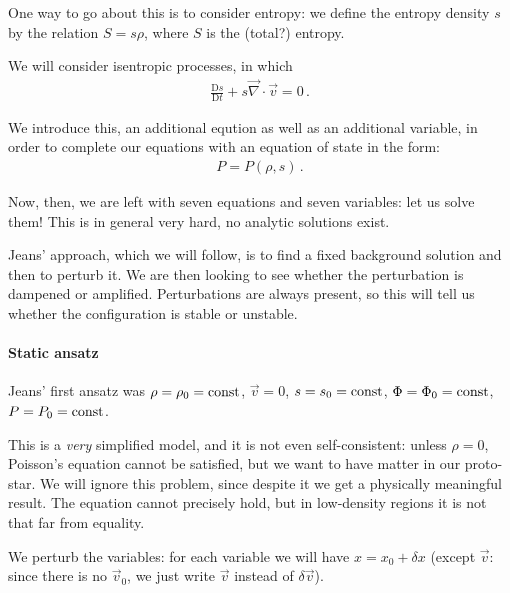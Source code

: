 \documentclass[main.tex]{subfiles}
\begin{document}
One way to go about this is to consider entropy: we define the entropy density \(s \) by the relation \(S  = s \rho \), where \(S\) is the (total?) entropy. 

We will consider isentropic processes, in which 
%
\begin{align}
  \frac{ \mathrm{D} s}{\mathrm{D}t} + s \vec{\nabla} \cdot \vec{v} = 0
\,.
\end{align}

We introduce this, an additional eqution as well as an additional variable, in order to complete our equations with an equation of state in the form: 
%
\begin{align}
P = P(\rho , s)
\,.
\end{align}

Now, then, we are left with seven equations and seven variables: let us solve them!
This is in general very hard, no analytic solutions exist.

Jeans' approach, which we will follow, is to find a fixed background solution and then to perturb it. 
We are then looking to see whether the perturbation is dampened or amplified. Perturbations are always present, so this will tell us whether the configuration is stable or unstable.

\paragraph{Static ansatz}

Jeans' first ansatz was \(\rho = \rho_0 = \text{const}\), \(\vec{v} = 0\), \(s = s_0 =  \text{const}\), \(\Phi = \Phi_0 = \text{const}\), \(P =P_0 = \text{const}\). 

This is a \emph{very} simplified model, and it is not even self-consistent: unless \(\rho  = 0\), Poisson's equation cannot be satisfied, but we want to have matter in our proto-star.
We will ignore this problem, since despite it we get a physically meaningful result.
The equation cannot precisely hold, but in low-density regions it is not that far from equality.

We perturb the variables: for each variable we will have \(x = x_0 + \delta x\) (except \(\vec{v}\): since there is no \(\vec{v}_0 \), we just write \(\vec{v}\) instead of \(\delta \vec{v}\)). 
\end{document}
